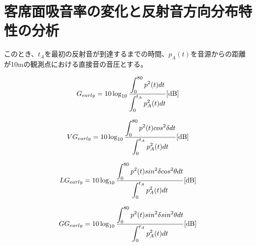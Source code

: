\section{客席面吸音率の変化と反射音方向分布特性の分析}


このとき、$t_A$を最初の反射音が到達するまでの時間、$p_A(t)$を音源からの距離が10mの観測点における直接音の音圧とする。

\begin{equation}
  \label{eq:}
  G_{early} = 10\log_{10}{\frac{\displaystyle\int_0^{80}p^2(t)dt}{\displaystyle\int_0^{t_A}p_{A}^2(t)dt}} \textrm{[dB]}
\end{equation}

\begin{equation}
  \label{eq:}
  VG_{early} = 10\log_{10}{\frac{\displaystyle\int_0^{80}p^2(t)cos^2{\delta}dt}{\displaystyle\int_0^{t_A}p_{A}^2(t)dt}} \textrm{[dB]}
\end{equation}

\begin{equation}
  \label{eq:}
  LG_{early} = 10\log_{10}{\frac{\displaystyle\int_0^{80}p^2(t)sin^2{\delta}cos^2{\theta}dt}{\displaystyle\int_0^{t_A}p_{A}^2(t)dt}} \textrm{[dB]}
\end{equation}

\begin{equation}
  \label{eq:}
  GG_{early} = 10\log_{10}{\frac{\displaystyle\int_0^{80}p^2(t)sin^2{\delta}sin^2{\theta}dt}{\displaystyle\int_0^{t_A}p_{A}^2(t)dt}} \textrm{[dB]}
\end{equation}


